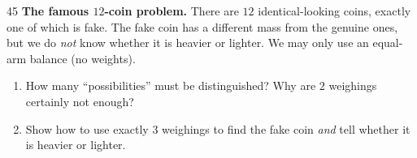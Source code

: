\begin{probbox}{45}{}
\textbf{The famous $12$-coin problem.} There are $12$ identical-looking coins, exactly one of which is fake. The fake coin has a different
mass from the genuine ones, but we do \emph{not} know whether it is heavier or lighter. We may only use an equal-arm balance (no weights).
\begin{enumerate}[label=\alph*),leftmargin=1.6em,itemsep=1pt,topsep=2pt]
  \item How many ``possibilities'' must be distinguished? Why are $2$ weighings certainly not enough?
  \item Show how to use exactly $3$ weighings to find the fake coin \emph{and} tell whether it is heavier or lighter.
\end{enumerate}
\end{probbox}
